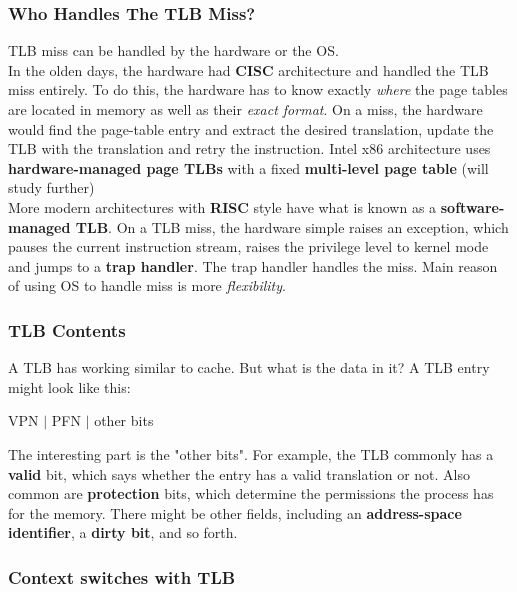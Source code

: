 \subsubsection{Who Handles The TLB Miss?}

TLB miss can be handled by the hardware or the OS.\\

In the olden days, the hardware had \textbf{CISC} architecture and handled the
TLB miss entirely. To do this, the hardware has to know exactly \textit{where}
the page tables are located in memory as well as their \textit{exact format}.
On a miss, the hardware would find the page-table entry and extract the
desired translation, update the TLB with the translation and retry the
instruction. Intel x86 architecture uses \textbf{hardware-managed page TLBs} 
with a fixed \textbf{multi-level page table} (will study further)\\

More modern architectures with \textbf{RISC} style have what is
known as a \textbf{software-managed TLB}. On a TLB miss, the hardware simple 
raises an exception, which pauses the current instruction stream, raises the
privilege level to kernel mode and jumps to a \textbf{trap handler}. The
trap handler handles the miss. Main reason of using OS to handle miss is 
more \textit{flexibility}.

\subsubsection{TLB Contents}

A TLB has working similar to cache. But what is the data in it? A TLB entry
might look like this:

\begin{center}
    VPN $|$ PFN $|$ other bits
\end{center}

The interesting part is the "other bits". For example, the TLB commonly has a
\textbf{valid} bit,  which says whether the entry has a valid translation or
not. Also common are \textbf{protection} bits, which determine the permissions
the process has for the memory. There might be other fields, including an
\textbf{address-space identifier}, a \textbf{dirty bit}, and so forth.

\subsubsection{Context switches with TLB}

